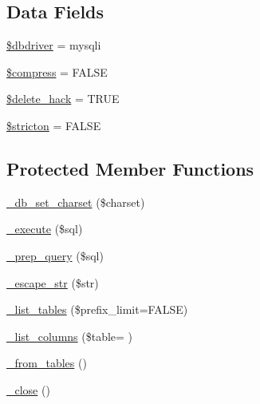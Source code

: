 \subsection*{Data Fields}
\begin{DoxyCompactItemize}
\item 
\hyperlink{class_c_i___d_b__mysqli__driver_a0cde2a16322a023d040aa7f725877597}{\$dbdriver} = \textquotesingle{}mysqli\textquotesingle{}
\item 
\hyperlink{class_c_i___d_b__mysqli__driver_abf799de0d30288b91ee73769281dd69d}{\$compress} = F\+A\+L\+S\+E
\item 
\hyperlink{class_c_i___d_b__mysqli__driver_ad60008f32a478e978c7c3284f320f273}{\$delete\+\_\+hack} = T\+R\+U\+E
\item 
\hyperlink{class_c_i___d_b__mysqli__driver_afb42d9811bec1da94506e5764e1439e0}{\$stricton} = F\+A\+L\+S\+E
\end{DoxyCompactItemize}
\subsection*{Protected Member Functions}
\begin{DoxyCompactItemize}
\item 
\hyperlink{class_c_i___d_b__mysqli__driver_a2b808d420d8e9fea0b73ad7127f5efb8}{\+\_\+db\+\_\+set\+\_\+charset} (\$charset)
\item 
\hyperlink{class_c_i___d_b__mysqli__driver_a114ab675d89bf8324a41785fb475e86d}{\+\_\+execute} (\$sql)
\item 
\hyperlink{class_c_i___d_b__mysqli__driver_a86af88ef0fa6d44ab4691e3f53270339}{\+\_\+prep\+\_\+query} (\$sql)
\item 
\hyperlink{class_c_i___d_b__mysqli__driver_af8ef0237bfcdb19215b63fff769e7a55}{\+\_\+escape\+\_\+str} (\$str)
\item 
\hyperlink{class_c_i___d_b__mysqli__driver_a435c0f3ce54fe7daa178baa8532ebd54}{\+\_\+list\+\_\+tables} (\$prefix\+\_\+limit=F\+A\+L\+S\+E)
\item 
\hyperlink{class_c_i___d_b__mysqli__driver_a2a81bb476a5c76fe6f763b0557c1e4c2}{\+\_\+list\+\_\+columns} (\$table= \textquotesingle{}\textquotesingle{})
\item 
\hyperlink{class_c_i___d_b__mysqli__driver_aef43f7e3e7b71d337ff3724c5eb14f10}{\+\_\+from\+\_\+tables} ()
\item 
\hyperlink{class_c_i___d_b__mysqli__driver_a4d9082658000e5ede8312067c6dda9db}{\+\_\+close} ()
\end{DoxyCompactItemize}
